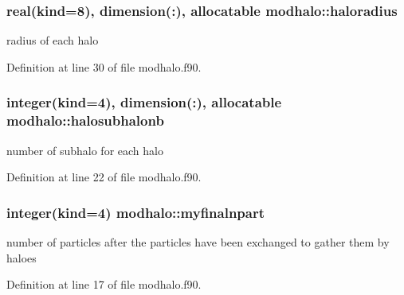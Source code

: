 \subsubsection[{\texorpdfstring{haloradius}{haloradius}}]{\setlength{\rightskip}{0pt plus 5cm}real(kind=8), dimension(\+:), allocatable modhalo\+::haloradius}\hypertarget{namespacemodhalo_ac245616b2bd1db72ab7891e811f668de}{}\label{namespacemodhalo_ac245616b2bd1db72ab7891e811f668de}


radius of each halo 



Definition at line 30 of file modhalo.\+f90.

\subsubsection[{\texorpdfstring{halosubhalonb}{halosubhalonb}}]{\setlength{\rightskip}{0pt plus 5cm}integer(kind=4), dimension(\+:), allocatable modhalo\+::halosubhalonb}\hypertarget{namespacemodhalo_a5047e50f3939eaf91496eb430ea12952}{}\label{namespacemodhalo_a5047e50f3939eaf91496eb430ea12952}


number of subhalo for each halo 



Definition at line 22 of file modhalo.\+f90.

\subsubsection[{\texorpdfstring{myfinalnpart}{myfinalnpart}}]{\setlength{\rightskip}{0pt plus 5cm}integer(kind=4) modhalo\+::myfinalnpart}\hypertarget{namespacemodhalo_a52f1f25dcc26f652f137e54813e02309}{}\label{namespacemodhalo_a52f1f25dcc26f652f137e54813e02309}


number of particles after the particles have been exchanged to gather them by haloes 



Definition at line 17 of file modhalo.\+f90.

